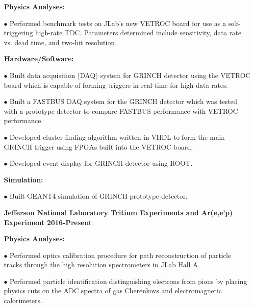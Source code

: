 \documentclass[letterpaper,10pt]{article}
\renewenvironment{itemize}{
  \begin{list}{}{
    \setlength{\leftmargin}{1.5em}
  }
}{
  \end{list}
}
\begin{document}
{\begin{itemize}
 \begin{itemize}\itemsep5pt \parskip0pt 
  \item \textbf{Physics Analyses:}
    \begin{itemize}\itemsep5pt \parskip0pt 
     \item $\bullet$ Performed benchmark tests on JLab's new VETROC board for use as a self-triggering high-rate TDC. Parameters determined include sensitivity, data rate vs. dead time, and two-hit resolution.
     \end{itemize}

  \item \textbf{Hardware/Software:}
    \begin{itemize}\itemsep5pt \parskip0pt 
     \item $\bullet$ Built data acquisition (DAQ) system for GRINCH detector using the VETROC board which is capable of forming triggers in real-time for high data rates. 
     \item $\bullet$ Built a FASTBUS DAQ system for the GRINCH detector which was tested with a prototype detector to compare FASTBUS performance with VETROC performance.
     \item $\bullet$ Developed cluster finding algorithm written in VHDL to form the main GRINCH trigger using FPGAs built into the VETROC board.
     \item $\bullet$ Developed event display for GRINCH detector using ROOT. 
    \end{itemize}
    
   \item \textbf{Simulation:}
     \begin{itemize}\itemsep5pt \parskip0pt 
      \item $\bullet$ Built GEANT4 simulation of GRINCH prototype detector.
     \end{itemize} 
 \end{itemize}
 
 \item {\large {\bf Jefferson National Laboratory Tritium Experiments and Ar(e,e'p) Experiment 2016-Present} }

 \begin{itemize}\itemsep5pt \parskip0pt 
  \item \textbf{Physics Analyses:}
    \begin{itemize}\itemsep5pt \parskip0pt 
     \item $\bullet$ Performed optics calibration procedure for path reconstruction of particle tracks through the high resolution spectrometers in JLab Hall A.
     \item $\bullet$ Performed particle identification distinguishing electrons from pions by placing physics cuts on the ADC spectra of gas Cherenkovs and electromagnetic calorimeters.
     \end{itemize}


\end{itemize}
\end{itemize}}
\end{document}
